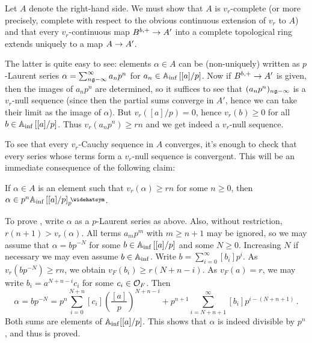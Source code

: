\begin{proof*}
	Let $A$ denote the right-hand side. We must show that $A$ is $v_r$-complete (or more precisely, complete with respect to the obvious continuous extension of $v_r$ to $A$) and that every $v_r$-continuous map $B^{b,+}\morphism A'$ into a complete topological ring extends uniquely to a map $A\morphism A'$.
	
	The latter is quite easy to see: elements $\alpha\in A$ can be (non-uniquely) written as $p$-Laurent series $\alpha=\sum_{n\gge -\infty}^\infty a_np^n$ for $a_n\in \mathbb{A}_{\mathrm{inf}} \left[[a]/p\right]$. Now if $B^{b,+}\morphism A'$ is given, then the images of $a_np^n$ are determined, so it suffices to see that $(a_np^n)_{n\gge -\infty}$ is a $v_r$-null sequence (since then the partial sums converge in $A'$, hence we can take their limit as the image of $\alpha$). But $v_r([a]/p)=0$, hence $v_r(b)\geq 0$ for all $b\in \mathbb{A}_{\mathrm{inf}}\left[[a]/p\right]$. Thus $v_r(a_np^n)\geq rn$ and we get indeed a $v_r$-null sequence.
	
	To see that every $v_r$-Cauchy sequence in $A$ converges, it's enough to check that every series whose terms form a $v_r$-null sequence is convergent. This will be an immediate consequence of the following claim:
	\begin{alphanumerate}
		\item[\itememph{*}] If $\alpha\in A$ is an element such that $v_r(\alpha)\geq rn$ for some $n\geq 0$, then $\alpha\in p^n\IA_\inf\left[[a]/p\right]_p^\complete$.
	\end{alphanumerate}
	To prove \itememph{*}, write $\alpha$ as a $p$-Laurent series as above. Also, without restriction, $r(n+1)>v_r(\alpha)$. All terms $a_mp^m$ with $m\geq n+1$ may be ignored, so we may assume that $\alpha=bp^{-N}$ for some $b\in \mathbb{A}_{\mathrm{inf}}\left[[a]/p\right]$ and some $N\geq 0$. Increasing $N$ if necessary we may even assume $b\in \mathbb{A}_{\mathrm{inf}}$. Write $b=\sum_{i=0}^\infty[b_i]p^i$. As $v_r(bp^{-N})\geq rn$, we obtain $v_F(b_i)\geq r(N+n-i)$. As $v_F(a)=r$, we may write $b_i=a^{N+n-i}c_i$ for some $c_i\in \mathcal{O}_F$. Then
	\begin{equation*}
		\alpha=bp^{-N}=p^n\sum_{i=0}^{N+n}[c_i]\left(\frac{[a]}{p}\right)^{N+n-i}+p^{n+1}\sum_{i=N+n+1}^\infty[b_i]p^{i-(N+n+1)}\,.
	\end{equation*}
	Both sums are elements of $\mathbb{A}_{\mathrm{inf}}[[a]/p]$. This shows that $\alpha$ is indeed divisible by $p^n$, and thus \itememph{*} is proved.
\end{proof*}


